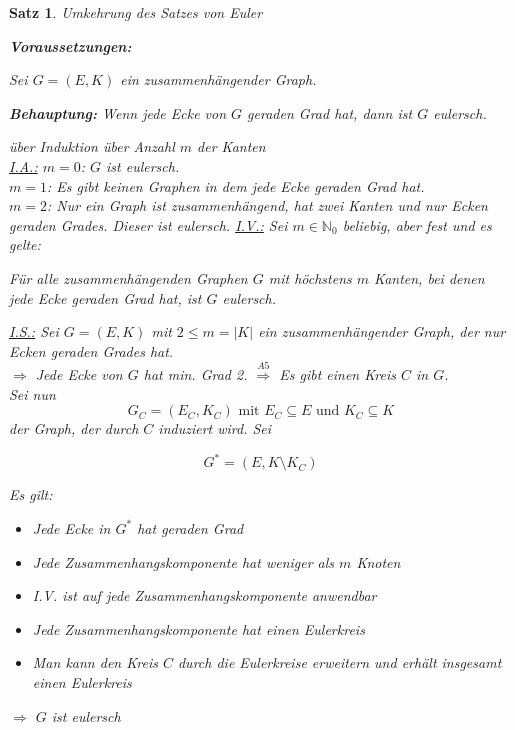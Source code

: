 \documentclass[a4paper,9pt]{scrartcl}
\newlength\Thmindent
\newenvironment{precondition}
  {\par\medskip\adjustwidth{\Thmindent}{}\normalfont\textbf{Voraussetzungen:}\par\nobreak}
  {\endadjustwidth}
\newenvironment{claim}
  {\par\medskip\adjustwidth{\Thmindent}{}\normalfont\textbf{Behauptung:}}
  {\endadjustwidth}
\theoremstyle{plain}
\newtheorem{theorem}{Satz}
\newcommand{\cmark}{\ding{51}}%
\begin{document}
\begin{theorem}{Umkehrung des Satzes von Euler}
    ~~~
    \begin{precondition}
        Sei $G = (E, K)$ ein zusammenhängender Graph.
    \end{precondition}
    \begin{claim}
        Wenn jede Ecke von $G$ geraden Grad hat, dann ist $G$ eulersch.
    \end{claim}
    \begin{Proof} über Induktion über Anzahl $m$ der Kanten\\
        \underline{I.A.:} $m=0$: $G$ ist eulersch. \cmark\\
        $m=1$: Es gibt keinen Graphen in dem jede Ecke geraden Grad hat. \cmark\\
        $m=2$: Nur ein Graph ist zusammenhängend, hat zwei Kanten und nur Ecken geraden Grades. Dieser ist eulersch. \cmark
        \goodbreak
        \underline{I.V.:} Sei $m \in \mathbb{N}_0$ beliebig, aber fest und 
        es gelte: 

        Für alle zusammenhängenden Graphen $G$ mit höchstens $m$ Kanten, bei denen jede Ecke geraden Grad hat, ist $G$ eulersch.

        \underline{I.S.:} Sei $G=(E,K)$ mit $2 \leq m  = |K|$ ein zusammenhängender Graph, der nur Ecken geraden Grades hat.\\
        $\Rightarrow$ Jede Ecke von $G$ hat min. Grad 2.
        $\stackrel{A5}{\Rightarrow}$ Es gibt einen Kreis $C$ in $G$.\\

        Sei nun 
            \[G_C = (E_C, K_C) \text{ mit } E_C \subseteq E \text{ und } K_C \subseteq K \]
        der Graph, der durch $C$ induziert wird.
        Sei 

            \[ G^* = (E, K \setminus K_C) \]

        Es gilt: 
        \begin{itemize}
            \item Jede Ecke in $G^*$ hat geraden Grad
            \item Jede Zusammenhangskomponente hat weniger als $m$ Knoten
            \item[$\Rightarrow$] I.V. ist auf jede Zusammenhangskomponente anwendbar
            \item[$\Rightarrow$] Jede Zusammenhangskomponente hat einen Eulerkreis
            \item[$\Rightarrow$] Man kann den Kreis $C$ durch die Eulerkreise erweitern und erhält insgesamt einen Eulerkreis
        \end{itemize}
        $\Rightarrow$ $G$ ist eulersch 
    \end{Proof}
\end{theorem}
\vspace{0.5cm}
\end{document}
